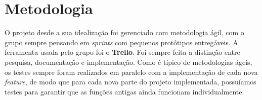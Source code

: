 \chapter{Metodologia}


O projeto desde a sua idealização foi gerenciado com metodologia ágil, com o grupo sempre pensando em \textit{sprints} com pequenos protótipos entregáveis. A ferramenta usada pelo grupo foi o \textbf{Trello}. Foi sempre feita a distinção entre pesquisa, documentação e implementação. Como é típico de metodologias ágeis, os testes sempre foram realizados em paralelo com a implementação de cada nova \textit{feature}, de modo que para cada nova parte do projeto implementada, possuíamos testes para garantir que as funções antigas ainda funcionam individualmente.